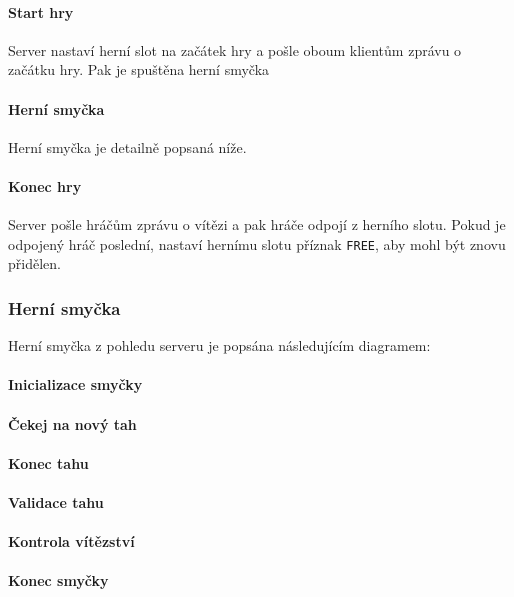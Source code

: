 \documentclass[11pt,a4paper]{scrartcl}
\begin{document}
	\paragraph{Start hry}
	Server nastaví herní slot na začátek hry a pošle oboum klientům zprávu o začátku hry. Pak je spuštěna herní smyčka
	
	\paragraph{Herní smyčka}
	Herní smyčka je detailně popsaná níže.
	
	\paragraph{Konec hry}
	Server pošle hráčům zprávu o vítězi a pak hráče odpojí z herního slotu. Pokud je odpojený hráč poslední, nastaví hernímu slotu příznak \verb|FREE|, aby mohl být znovu přidělen.
	
	\subsubsection{Herní smyčka}
	Herní smyčka z pohledu serveru je popsána následujícím diagramem:
	
	\paragraph{Inicializace smyčky}
	
	\paragraph{Čekej na nový tah}
	
	\paragraph{Konec tahu}
	
	\paragraph{Validace tahu}
	
	\paragraph{Kontrola vítězství}
	
	\paragraph{Konec smyčky}
	
\end{document}
